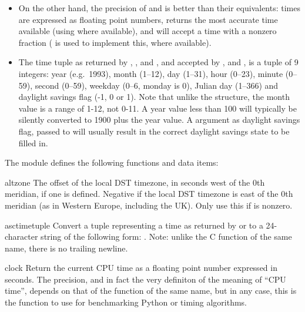 \begin{itemize}
\item
On the other hand, the precision of  and
 is better than their \UNIX{} equivalents: times are
expressed as floating point numbers,  returns the
most accurate time available (using \UNIX{} 
where available), and  will accept a time with a
nonzero fraction (\UNIX{}  is used to implement
this, where available).

\item
The time tuple as returned by ,
, and , and accepted by
,  and , is a
tuple of 9 integers: year (e.g.\ 1993), month (1--12), day (1--31),
hour (0--23), minute (0--59), second (0--59), weekday (0--6, monday is
0), Julian day (1--366) and daylight savings flag (-1, 0  or 1).
Note that unlike the \C{} structure, the month value is a range of 1-12, not
0-11.  A year value less than 100 will typically be silently converted to
1900 plus the year value.  A  argument as daylight savings
flag, passed to  will usually result in the correct
daylight savings state to be filled in.

\end{itemize}

The module defines the following functions and data items:


\begin{datadesc}{altzone}
The offset of the local DST timezone, in seconds west of the 0th
meridian, if one is defined.  Negative if the local DST timezone is
east of the 0th meridian (as in Western Europe, including the UK).
Only use this if  is nonzero.
\end{datadesc}

\begin{funcdesc}{asctime}{tuple}
Convert a tuple representing a time as returned by  or
 to a 24-character string of the following form:
.  Note: unlike the C function of
the same name, there is no trailing newline.
\end{funcdesc}

\begin{funcdesc}{clock}{}
Return the current CPU time as a floating point number expressed in
seconds.  The precision, and in fact the very definiton of the meaning
of ``CPU time'', depends on that of the \C{} function
of the same name, but in any case, this is the function to use for
benchmarking Python or timing algorithms.
\end{funcdesc}

